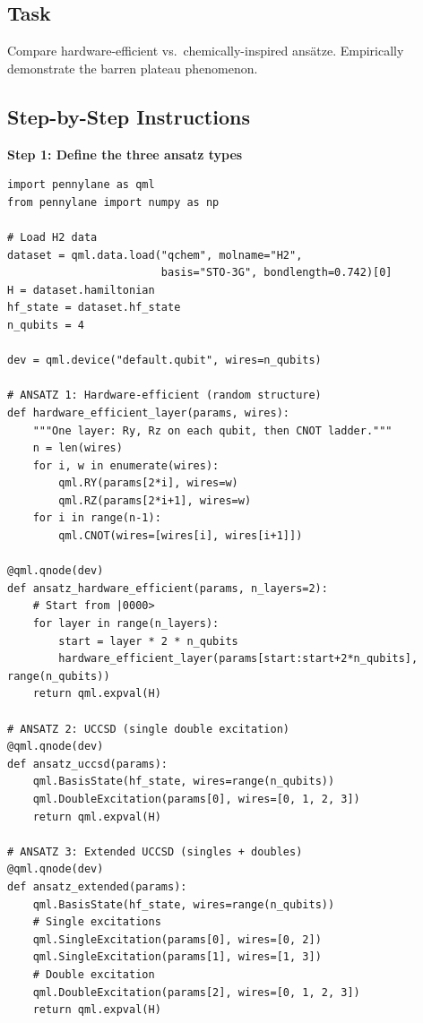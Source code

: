 \documentclass[11pt,a4paper]{article}
\begin{document}
\subsection*{Task}
Compare hardware-efficient vs.\ chemically-inspired ansätze. Empirically demonstrate the barren plateau phenomenon.

\subsection*{Step-by-Step Instructions}

\textbf{Step 1: Define the three ansatz types}
\begin{lstlisting}
import pennylane as qml
from pennylane import numpy as np

# Load H2 data
dataset = qml.data.load("qchem", molname="H2",
                        basis="STO-3G", bondlength=0.742)[0]
H = dataset.hamiltonian
hf_state = dataset.hf_state
n_qubits = 4

dev = qml.device("default.qubit", wires=n_qubits)

# ANSATZ 1: Hardware-efficient (random structure)
def hardware_efficient_layer(params, wires):
    """One layer: Ry, Rz on each qubit, then CNOT ladder."""
    n = len(wires)
    for i, w in enumerate(wires):
        qml.RY(params[2*i], wires=w)
        qml.RZ(params[2*i+1], wires=w)
    for i in range(n-1):
        qml.CNOT(wires=[wires[i], wires[i+1]])

@qml.qnode(dev)
def ansatz_hardware_efficient(params, n_layers=2):
    # Start from |0000>
    for layer in range(n_layers):
        start = layer * 2 * n_qubits
        hardware_efficient_layer(params[start:start+2*n_qubits], range(n_qubits))
    return qml.expval(H)

# ANSATZ 2: UCCSD (single double excitation)
@qml.qnode(dev)
def ansatz_uccsd(params):
    qml.BasisState(hf_state, wires=range(n_qubits))
    qml.DoubleExcitation(params[0], wires=[0, 1, 2, 3])
    return qml.expval(H)

# ANSATZ 3: Extended UCCSD (singles + doubles)
@qml.qnode(dev)
def ansatz_extended(params):
    qml.BasisState(hf_state, wires=range(n_qubits))
    # Single excitations
    qml.SingleExcitation(params[0], wires=[0, 2])
    qml.SingleExcitation(params[1], wires=[1, 3])
    # Double excitation
    qml.DoubleExcitation(params[2], wires=[0, 1, 2, 3])
    return qml.expval(H)
\end{lstlisting}
\end{document}
